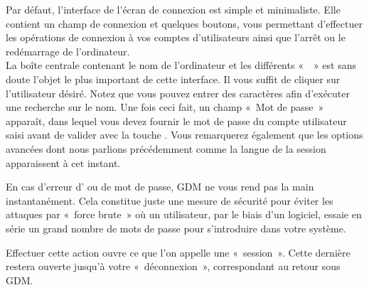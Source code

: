 Par défaut, l'interface de l'écran de connexion est simple et minimaliste. Elle contient un champ de connexion et quelques boutons, vous permettant d'effectuer les opérations de connexion à vos comptes d'utilisateurs ainsi que l'arrêt ou le redémarrage de l'ordinateur.\\ 
La boîte centrale contenant le nom de l'ordinateur et les différents «~~» est sans doute l'objet le plus important de cette interface. Il vous suffit de cliquer sur l'utilisateur désiré. Notez que vous pouvez entrer des caractères afin d'exécuter une recherche sur le nom. Une fois ceci fait, un champ «~Mot de passe~» apparaît, dans lequel vous devez fournir le mot de passe du compte utilisateur saisi avant de valider avec la touche . Vous remarquerez également que les options avancées dont nous parlions précédemment comme la langue de la session apparaissent à cet instant.\par
\begin{nota}
En cas d'erreur d' ou de mot de passe, GDM ne vous rend pas la main instantanément. Cela constitue juste une mesure de sécurité pour éviter les attaques par «~force brute~» où un utilisateur, par le biais d'un logiciel, essaie en série un grand nombre de mots de passe pour s'introduire dans votre système.
\end{nota}
Effectuer cette action ouvre ce que l'on appelle une «~session~». Cette dernière restera ouverte jusqu'à votre «~déconnexion~», correspondant au retour sous GDM.

